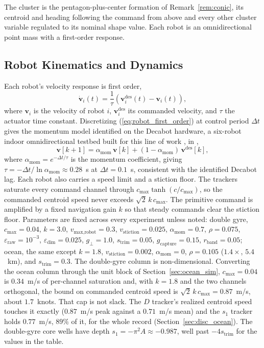\documentclass[lettersize,journal]{IEEEtran}
\begin{document}
The cluster is the pentagon-plus-center formation of
Remark~\ref{rem:conic}, its centroid and heading following the
command from above and every other cluster variable regulated to its
nominal shape value. Each robot is an omnidirectional point mass with a
first-order response.

\subsection{Robot Kinematics and Dynamics}
\label{sec:robot_model}

Each robot's velocity response is first order,
\begin{equation}
    \dot{\mathbf{v}}_i(t) = \frac{1}{\tau}\left(
    \mathbf{v}_i^{\text{des}}(t) - \mathbf{v}_i(t)\right),
    \label{eq:robot_first_order}
\end{equation}
where $\mathbf{v}_i$ is the velocity of robot $i$,
$\mathbf{v}_i^{\text{des}}$ its commanded velocity, and $\tau$ the
actuator time constant.
Discretizing (\ref{eq:robot_first_order}) at control period $\Delta t$
gives the momentum model identified on the Decabot hardware, a
six-robot indoor omnidirectional testbed built for this line of work
\cite{38,39}, in \cite{9},
\begin{equation}
    \mathbf{v}[k+1] = \alpha_{\text{mom}}\,\mathbf{v}[k]
    + (1 - \alpha_{\text{mom}})\,\mathbf{v}^{\text{des}}[k],
    \label{eq:momentum}
\end{equation}
where $\alpha_{\text{mom}} = e^{-\Delta t/\tau}$ is the momentum
coefficient, giving $\tau = -\Delta
t/\ln\alpha_{\text{mom}} \approx 0.28$~s at $\Delta t = 0.1$~s,
consistent with the identified Decabot lag. Each robot also carries a
speed limit and a stiction floor.
The trackers saturate every command channel through
$c_{\max}\tanh(c/c_{\max})$, so the commanded centroid speed never
exceeds $\sqrt{2}\,k\,c_{\max}$. The primitive command is amplified by a
fixed navigation gain $k$ so that steady commands clear the stiction
floor. Parameters are fixed across every experiment unless noted:
double gyre, $c_{\max} = 0.04$, $k = 3.0$,
$v_{\text{max,robot}} = 0.3$, $v_{\text{stiction}} = 0.025$,
$\alpha_{\text{mom}} = 0.7$, $\rho = 0.075$, $\varepsilon_{\text{raw}} =
10^{-3}$, $\varepsilon_{\text{dim}} = 0.025$, $g_\perp = 1.0$,
$s_{\mathrm{trim}} = 0.05$, $g_{\text{capture}} = 0.15$, $r_{\text{band}}
= 0.05$; ocean, the same except $k = 1.8$, $v_{\text{stiction}} =
0.002$, $\alpha_{\text{mom}} = 0$, $\rho = 0.105$ ($1.4\times$, $5.4$~km),
and $s_{\mathrm{trim}} = 0.3$. The double-gyre column is
non-dimensional. Converting the ocean column through the unit block of
Section~\ref{sec:ocean_sim}, $c_{\max} = 0.04$ is $0.34$~m/s of
per-channel saturation and, with $k = 1.8$ and the two channels
orthogonal, the bound on commanded centroid speed is
$\sqrt{2}\,k\,c_{\max} = 0.87$~m/s, about $1.7$~knots. That cap is not
slack. The $D$ tracker's realized centroid speed touches it exactly
($0.87$~m/s peak against a $0.71$~m/s mean) and the $s_1$ tracker holds
$0.77$~m/s, $89\%$ of it, for the whole record
(Section~\ref{sec:disc_ocean}). The double-gyre
core wells have depth $s_1 = -\pi^2 A \approx -0.987$, well past
$-4s_{\mathrm{trim}}$ for the values in the table.
\end{document}
